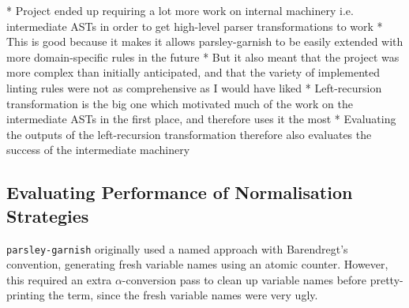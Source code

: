 \documentclass[../../main.tex]{subfiles}
\begin{document}
\label{sec:evaluation}

* Project ended up requiring a lot more work on internal machinery i.e. intermediate ASTs in order to get high-level parser transformations to work
* This is good because it makes it allows parsley-garnish to be easily extended with more domain-specific rules in the future
* But it also meant that the project was more complex than initially anticipated, and that the variety of implemented linting rules were not as comprehensive as I would have liked
* Left-recursion transformation is the big one which motivated much of the work on the intermediate ASTs in the first place, and therefore uses it the most
* Evaluating the outputs of the left-recursion transformation therefore also evaluates the success of the intermediate machinery

\subsection{Evaluating Performance of Normalisation Strategies}
\texttt{parsley-garnish} originally used a named approach with Barendregt's convention, generating fresh variable names using an atomic counter.
However, this required an extra $\alpha$-conversion pass to clean up variable names before pretty-printing the term, since the fresh variable names were very ugly.


        
\end{document}
